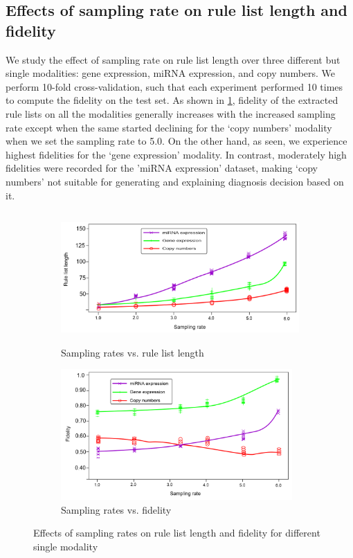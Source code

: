 \subsection{Effects of sampling rate on rule list length and fidelity}
We study the effect of sampling rate on rule list length over three different but single modalities: gene expression, miRNA expression, and copy numbers. We perform 10-fold cross-validation, such that each experiment performed 10 times to compute the fidelity on the test set. As shown in \cref{fig:lr_vs_length}, fidelity of the extracted rule lists on all the modalities generally increases with the increased sampling rate except when the same started declining for the `copy numbers' modality when we set the sampling rate to 5.0. On the other hand, as seen, we experience highest fidelities for the `gene expression' modality. In contrast, moderately high fidelities were recorded for the 'miRNA expression' dataset, making `copy numbers' not suitable for generating and explaining diagnosis decision based on it. 

\begin{figure}[h!]
	\centering
	\begin{subfigure}{.48\linewidth}
		\centering
		\includegraphics[width=\linewidth,height=50mm]{images/sr_vs_ll.png}
		\caption{Sampling rates vs. rule list length}
        \label{fig:lr_vs_length}
	\end{subfigure}
	\begin{subfigure}{0.48\linewidth}
		\centering
		\includegraphics[width=\linewidth,height=50mm]{images/sr_vs_fide.png}
		\caption{Sampling rates vs. fidelity}
        \label{fig:lr_vs_fidelity}
	\end{subfigure}
	\caption{Effects of sampling rates on rule list length and fidelity for different single modality} 
	\label{fig:lr_vs_length_and_fidelity}
\end{figure}


